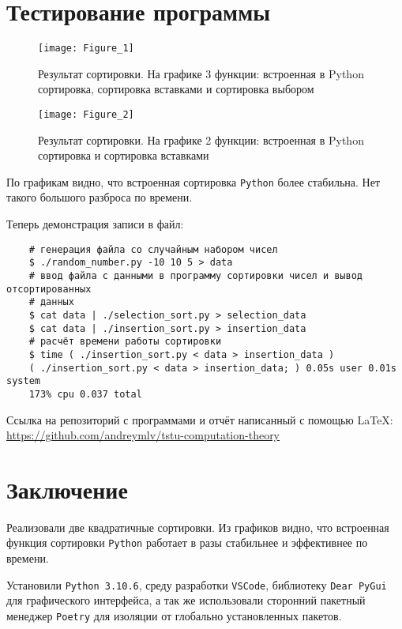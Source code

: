 \section{Тестирование программы}

\begin{figure}[H]
    \begin{center}
        \texttt{[image: Figure\_1]}
        \caption{Результат сортировки. На графике 3 функции: встроенная в Python
            сортировка, сортировка вставками и сортировка выбором}
    \end{center}
\end{figure}

\begin{figure}[H]
    \begin{center}
        \texttt{[image: Figure\_2]}
        \caption{Результат сортировки. На графике 2 функции: встроенная в Python
            сортировка и сортировка вставками}
    \end{center}
\end{figure}

По графикам видно, что встроенная сортировка \verb|Python| более стабильна.
Нет такого большого разброса по времени.

Теперь демонстрация записи в файл:

\begin{verbatim}
    # генерация файла со случайным набором чисел
    $ ./random_number.py -10 10 5 > data
    # ввод файла с данными в программу сортировки чисел и вывод отсортированных
    # данных
    $ cat data | ./selection_sort.py > selection_data
    $ cat data | ./insertion_sort.py > insertion_data
    # расчёт времени работы сортировки
    $ time ( ./insertion_sort.py < data > insertion_data )
    ( ./insertion_sort.py < data > insertion_data; ) 0.05s user 0.01s system
    173% cpu 0.037 total
\end{verbatim}

Ссылка на репозиторий с программами и отчёт написанный с помощью \LaTeX:
\url{https://github.com/andreymlv/tstu-computation-theory}

\section*{Заключение}
Реализовали две квадратичные сортировки. Из графиков видно, что встроенная
функция сортировки \verb|Python| работает в разы стабильнее и эффективнее по
времени.

Установили \verb|Python 3.10.6|, среду разработки \verb|VSCode|, библиотеку
\verb|Dear PyGui| для графического интерфейса, а так же использовали сторонний
пакетный менеджер \verb|Poetry| для изоляции от глобально установленных пакетов.
